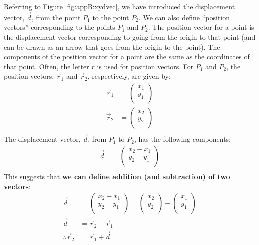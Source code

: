 Referring to Figure \ref{fig:appB:xydvec}, we have introduced the displacement vector, $\vec d$, from the point $P_1$ to the point $P_2$. We can also define ``position vectors'' corresponding to the points $P_1$ and $P_2$. The position vector for a point is the displacement vector corresponding to going from the origin to that point (and can be drawn as an arrow that goes from the origin to the point). The components of the position vector for a point are the same as the coordinates of that point. Often, the letter $r$ is used for position vectors. For $P_1$ and $P_2$, the position vectors, $\vec r_1$ and $\vec r_2$, respectively, are given by:
\begin{align*}
\vec r_1&=\begin{pmatrix}
           x_1 \\
           y_1 \\
         \end{pmatrix}\\
\vec r_2&=\begin{pmatrix}
           x_2 \\
           y_2 \\
         \end{pmatrix}\\
\end{align*}
The displacement vector, $\vec d$, from $P_1$ to $P_2$, has the following components:
\begin{align*}
\vec{d}&=\begin{pmatrix}
           x_2-x_1 \\
           y_2-y_1 \\
         \end{pmatrix}\\
\end{align*}
This suggests that \textbf{we can define addition (and subtraction) of two vectors}:
\begin{align*}
\vec{d}&=\begin{pmatrix}
           x_2-x_1 \\
           y_2-y_1 \\
         \end{pmatrix}=\begin{pmatrix}
           x_2 \\
           y_2 \\
         \end{pmatrix}-\begin{pmatrix}
           x_1 \\
           y_1 \\
         \end{pmatrix}\\
         \vec d&=\vec r_2-\vec r_1\\
         \therefore \vec r_2&=\vec r_1+\vec d
\end{align*}
